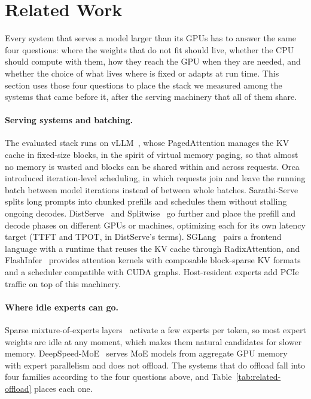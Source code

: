 \section{Related Work}\label{sec:related}

Every system that serves a model larger than its GPUs has to answer the same four questions: where the weights that
do not fit should live, whether the CPU should compute with them, how they reach the GPU when they are needed, and
whether the choice of what lives where is fixed or adapts at run time. This section uses those four questions to
place the stack we measured among the systems that came before it, after the serving machinery that all of them share.

\paragraph{Serving systems and batching.}
The evaluated stack runs on vLLM~\citep{kwon2023vllm,vllm2026github}, whose PagedAttention manages the KV cache in
fixed-size blocks, in the spirit of virtual memory paging, so that almost no memory is wasted and blocks can be shared
within and across requests. Orca~\citep{yu2022orca} introduced iteration-level scheduling, in which requests join and
leave the running batch between model iterations instead of between whole batches. Sarathi-Serve~\citep{agrawal2024sarathi}
splits long prompts into chunked prefills and schedules them without stalling ongoing decodes.
DistServe~\citep{zhong2024distserve} and Splitwise~\citep{patel2024splitwise} go further and place the prefill and
decode phases on different GPUs or machines, optimizing each for its own latency target (TTFT and TPOT, in DistServe's
terms). SGLang~\citep{zheng2024sglang} pairs a frontend language with a runtime that reuses the KV cache through
RadixAttention, and FlashInfer~\citep{ye2025flashinfer,flashinfer2026github} provides attention kernels with composable
block-sparse KV formats and a scheduler compatible with CUDA graphs. Host-resident experts add PCIe traffic on top of
this machinery.

\paragraph{Where idle experts can go.}
Sparse mixture-of-experts layers~\citep{shazeer2017outrageously,lepikhin2021gshard,fedus2022switch} activate a few
experts per token, so most expert weights are idle at any moment, which makes them natural candidates for slower
memory. DeepSpeed-MoE~\citep{rajbhandari2022deepspeedmoe} serves MoE models from aggregate GPU memory with expert
parallelism and does not offload. The systems that do offload fall into four families according to the four questions
above, and Table~\ref{tab:related-offload} places each one.

